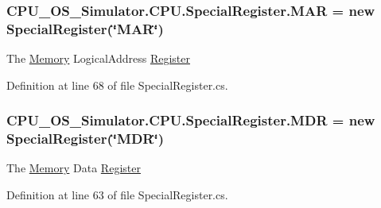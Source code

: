 \subsubsection[{M\+A\+R}]{ C\+P\+U\+\_\+\+O\+S\+\_\+\+Simulator.\+C\+P\+U.\+Special\+Register.\+M\+A\+R = new {\bf Special\+Register}(\char`\"{}M\+A\+R\char`\"{})\hspace{0.3cm}{\ttfamily [static]}}\label{class_c_p_u___o_s___simulator_1_1_c_p_u_1_1_special_register_a2ae89cee8b74f9985f43ee4e6f994bad}


The \hyperlink{namespace_c_p_u___o_s___simulator_1_1_memory}{Memory} Logical\+Address \hyperlink{class_c_p_u___o_s___simulator_1_1_c_p_u_1_1_register}{Register} 



Definition at line 68 of file Special\+Register.\+cs.

\hypertarget{class_c_p_u___o_s___simulator_1_1_c_p_u_1_1_special_register_aabf7c761e1f8a9994b7c0b131c53924d}{}
\subsubsection[{M\+D\+R}]{ C\+P\+U\+\_\+\+O\+S\+\_\+\+Simulator.\+C\+P\+U.\+Special\+Register.\+M\+D\+R = new {\bf Special\+Register}(\char`\"{}M\+D\+R\char`\"{})\hspace{0.3cm}{\ttfamily [static]}}\label{class_c_p_u___o_s___simulator_1_1_c_p_u_1_1_special_register_aabf7c761e1f8a9994b7c0b131c53924d}


The \hyperlink{namespace_c_p_u___o_s___simulator_1_1_memory}{Memory} Data \hyperlink{class_c_p_u___o_s___simulator_1_1_c_p_u_1_1_register}{Register} 



Definition at line 63 of file Special\+Register.\+cs.

\hypertarget{class_c_p_u___o_s___simulator_1_1_c_p_u_1_1_special_register_ac521aef66f5fe6a88486e70f5ade8326}{}
